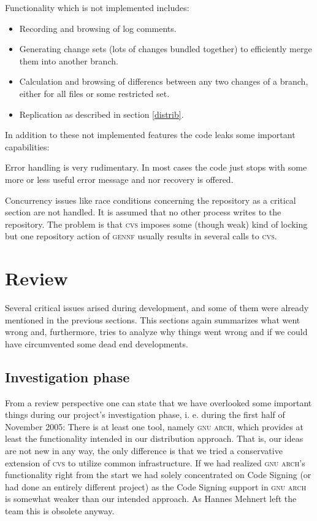 \documentclass[fleqn, 10pt, a4paper]{report} \usepackage{amssymb}
\newcommand{\GENNF}{\textsc{gennf}}
\begin{document}
Functionality which is not implemented includes:

\begin{itemize}
\item Recording and browsing of log comments.
\item Generating change sets (lots of changes bundled together) to
  efficiently merge them into another branch.
\item Calculation and browsing of differencs between any two changes
  of a branch, either for all files or some restricted set.
\item Replication as described in section \ref{distrib}.
\end{itemize}

In addition to these not implemented features the code leaks some
important capabilities:

Error handling is very rudimentary. In most cases the code just stops
with some more or less useful error message and nor recovery is
offered.

Concurrency issues like race conditions concerning the repository as a
critical section are not handled. It is assumed that no other process
writes to the repository. The problem is that \textsc{cvs} imposes
some (though weak) kind of locking but one repository action of
\GENNF{} usually results in several calls to \textsc{cvs}.


\section{Review}

Several critical issues arised during development, and some of them
were already mentioned in the previous sections.
This sections again summarizes what went wrong and, furthermore, tries
to analyze why things went wrong and if we could have circumvented
some dead end developments.


\subsection{Investigation phase}

From a review perspective one can state that we have overlooked some
important things during our project's investigation phase, i. e.
during the first half of November 2005: There is at least one tool,
namely \textsc{gnu arch}, which provides at least the functionality
intended in our distribution approach. That is, our ideas are
not new in any way, the only difference is that we tried a conservative
extension of \textsc{cvs} to utilize common infrastructure.
If we had realized \textsc{gnu arch}'s functionality right from the
start we had solely concentrated on Code Signing (or had done an
entirely different project) as the Code Signing support in \textsc{gnu arch}
is somewhat weaker than our intended approach. As Hannes Mehnert
left the team this is obsolete anyway.
\end{document}
